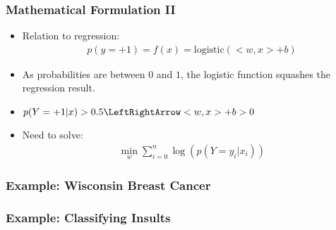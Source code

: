 \begin{frame}
    \frametitle{Mathematical Formulation II}
    \begin{itemize}
        \item Relation to regression:
            \begin{align}
                p(y=+1) = f(x) = \text{logistic}(<w, x> + b)
            \end{align}
        \item As probabilities are between $0$ and $1$, the logistic function
            squashes the regression result.
        \item $p(Y=+1 | x) > 0.5 \LeftRightArrow <w, x> + b > 0$
        \item Need to solve:
            \begin{align}
                \min_w \sum_{i=0}^n \log(p(Y=y_i | x_i))
            \end{align}
    \end{itemize}
\end{frame}

\begin{frame}
    \frametitle{Example: Wisconsin Breast Cancer}
\end{frame}

\begin{frame}
    \frametitle{Example: Classifying Insults}
\end{frame}


